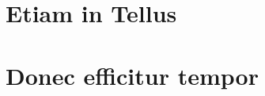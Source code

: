 \begin{appendices}
\chapter{Etiam in Tellus}\label{app:A}

\lipsum[11-12]

\chapter{ Donec efficitur tempor}\label{app:B}

\lipsum[12-13]
\end{appendices}
